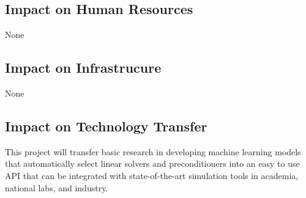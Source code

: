\subsection{Impact on Human Resources}
None

\subsection{Impact on Infrastrucure}
None

\subsection{Impact on Technology Transfer}
This project will transfer basic research in developing machine learning models that automatically select linear solvers and preconditioners into an easy to use API that can be integrated with state-of-the-art simulation tools in academia, national labs, and industry.

